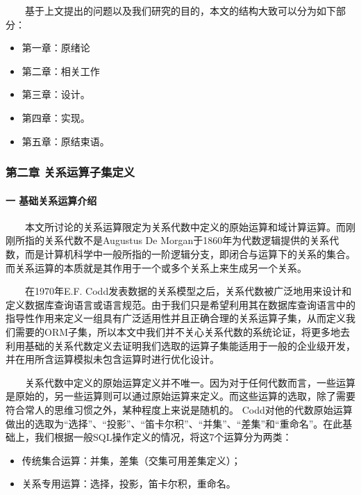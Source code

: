 \documentclass[]{article}
\begin{document}
　　基于上文提出的问题以及我们研究的目的，本文的结构大致可以分为如下部分：

\begin{itemize}
\itemsep1pt\parskip0pt
\item
  第一章：原绪论
\item
  第二章：相关工作
\item
  第三章：设计。
\item
  第四章：实现。
\item
  第五章：原结束语。
\end{itemize}

\subsubsection{第二章
关系运算子集定义}\label{ux7b2cux4e8cux7ae0-ux5173ux7cfbux8fd0ux7b97ux5b50ux96c6ux5b9aux4e49}

\paragraph{一
基础关系运算介绍}\label{ux4e00-ux57faux7840ux5173ux7cfbux8fd0ux7b97ux4ecbux7ecd}

　　本文所讨论的关系运算限定为关系代数中定义的原始运算和域计算运算。而刚刚所指的关系代数不是Augustus
De
Morgan于1860年为代数逻辑提供的关系代数，而是计算机科学中一般所指的一阶逻辑分支，即闭合与运算下的关系的集合。而关系运算的本质就是其作用于一个或多个关系上来生成另一个关系。

　　在1970年E.F.
Codd发表数据的关系模型之后，关系代数被广泛地用来设计和定义数据库查询语言或语言规范。由于我们只是希望利用其在数据库查询语言中的指导性作用来定义一组具有广泛适用性并且正确合理的关系运算子集，从而定义我们需要的ORM子集，所以本文中我们并不关心关系代数的系统论证，将更多地去利用基础的关系代数定义去证明我们选取的运算子集能适用于一般的企业级开发，并在用所含运算模拟未包含运算时进行优化设计。

　　关系代数中定义的原始运算定义并不唯一。因为对于任何代数而言，一些运算是原始的，另一些运算则可以通过原始运算来定义。而这些运算的选取，除了需要符合常人的思维习惯之外，某种程度上来说是随机的。
Codd对他的代数原始运算做出的选取为``选择''、``投影''、``笛卡尔积''、``并集''、``差集''和``重命名''。在此基础上，我们根据一般SQL操作定义的情况，将这7个运算分为两类：

\begin{itemize}
\itemsep1pt\parskip0pt
\item
  传统集合运算：并集，差集（交集可用差集定义）；
\item
  关系专用运算：选择，投影，笛卡尔积，重命名。
\end{itemize}
\end{document}
